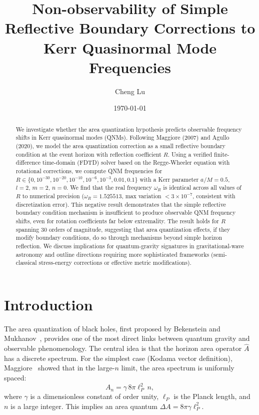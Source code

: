 \documentclass[10pt,amsmath,amssymb,amsfonts]{article}
\begin{document}
\title{Non-observability of Simple Reflective Boundary Corrections to Kerr Quasinormal Mode Frequencies}

\author{Cheng Lu}

\date{\today}

\begin{abstract}
We investigate whether the area quantization hypothesis predicts observable frequency shifts in Kerr quasinormal modes (QNMs). Following Maggiore (2007) and Agullo (2020), we model the area quantization correction as a small reflective boundary condition at the event horizon with reflection coefficient $R$. Using a verified finite-difference time-domain (FDTD) solver based on the Regge-Wheeler equation with rotational corrections, we compute QNM frequencies for $R \in \{0, 10^{-30}, 10^{-20}, 10^{-10}, 10^{-6}, 10^{-3}, 0.01, 0.1\}$ with a Kerr parameter $a/M = 0.5$, $l=2$, $m=2$, $n=0$. We find that the real frequency $\omega_R$ is identical across all values of $R$ to numerical precision ($\omega_R = 1.525513$, max variation $< 3 \times 10^{-7}$, consistent with discretization error). This negative result demonstrates that the simple reflective boundary condition mechanism is insufficient to produce observable QNM frequency shifts, even for rotation coefficients far below extremality. The result holds for $R$ spanning 30 orders of magnitude, suggesting that area quantization effects, if they modify boundary conditions, do so through mechanisms beyond simple horizon reflection. We discuss implications for quantum-gravity signatures in gravitational-wave astronomy and outline directions requiring more sophisticated frameworks (semi-classical stress-energy corrections or effective metric modifications).

\end{abstract}

\maketitle

\section{Introduction}

The area quantization of black holes, first proposed by Bekenstein and Mukhanov~\cite{bekenstein1995}, provides one of the most direct links between quantum gravity and observable phenomenology. The central idea is that the horizon area operator $\hat{A}$ has a discrete spectrum. For the simplest case (Kodama vector definition), Maggiore~\cite{maggiore2007} showed that in the large-$n$ limit, the area spectrum is uniformly spaced:
\begin{equation}
A_n = \gamma \, 8\pi\ell_P^2 \, n,
\end{equation}
where $\gamma$ is a dimensionless constant of order unity, $\ell_P$ is the Planck length, and $n$ is a large integer. This implies an area quantum $\Delta A = 8\pi\gamma\ell_P^2$.
\end{document}
